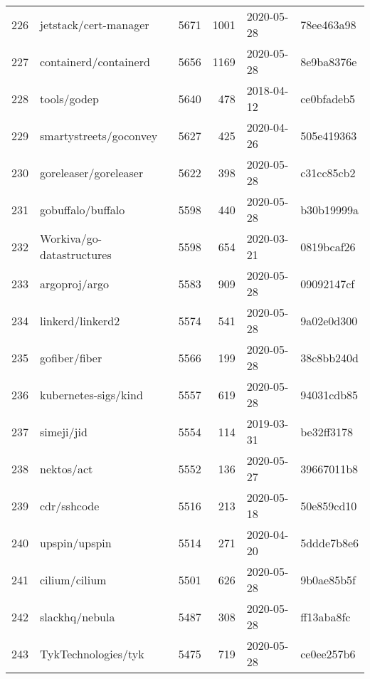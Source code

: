 \begin{longtable}{llrrll}
    226 &                              jetstack/cert-manager &   5671 &   1001 & 2020-05-28 &  78ee463a98 \\
    227 &                              containerd/containerd &   5656 &   1169 & 2020-05-28 &  8e9ba8376e \\
    228 &                                        tools/godep &   5640 &    478 & 2018-04-12 &  ce0bfadeb5 \\
    229 &                             smartystreets/goconvey &   5627 &    425 & 2020-04-26 &  505e419363 \\
    230 &                              goreleaser/goreleaser &   5622 &    398 & 2020-05-28 &  c31cc85cb2 \\
    231 &                                  gobuffalo/buffalo &   5598 &    440 & 2020-05-28 &  b30b19999a \\
    232 &                          Workiva/go-datastructures &   5598 &    654 & 2020-03-21 &  0819bcaf26 \\
    233 &                                      argoproj/argo &   5583 &    909 & 2020-05-28 &  09092147cf \\
    234 &                                   linkerd/linkerd2 &   5574 &    541 & 2020-05-28 &  9a02e0d300 \\
    235 &                                      gofiber/fiber &   5566 &    199 & 2020-05-28 &  38c8bb240d \\
    236 &                               kubernetes-sigs/kind &   5557 &    619 & 2020-05-28 &  94031cdb85 \\
    237 &                                         simeji/jid &   5554 &    114 & 2019-03-31 &  be32ff3178 \\
    238 &                                         nektos/act &   5552 &    136 & 2020-05-27 &  39667011b8 \\
    239 &                                        cdr/sshcode &   5516 &    213 & 2020-05-18 &  50e859cd10 \\
    240 &                                      upspin/upspin &   5514 &    271 & 2020-04-20 &  5ddde7b8e6 \\
    241 &                                      cilium/cilium &   5501 &    626 & 2020-05-28 &  9b0ae85b5f \\
    242 &                                     slackhq/nebula &   5487 &    308 & 2020-05-28 &  ff13aba8fc \\
    243 &                                TykTechnologies/tyk &   5475 &    719 & 2020-05-28 &  ce0ee257b6 \\

\end{longtable}
